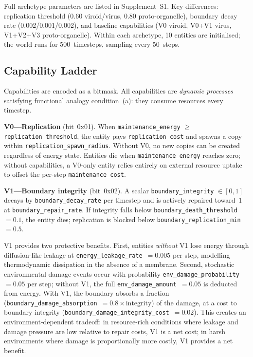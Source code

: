 \documentclass[letterpaper]{article}
\begin{document}
Full archetype parameters are listed in Supplement~S1.
Key differences: replication threshold (0.60 viroid/virus, 0.80 proto-organelle),
boundary decay rate (0.002/0.001/0.002), and baseline capabilities
(V0 viroid, V0+V1 virus, V1+V2+V3 proto-organelle).
Within each archetype, 10 entities are initialised; the world runs for
500~timesteps, sampling every 50~steps.

\subsection{Capability Ladder}

Capabilities are encoded as a bitmask.
All capabilities are \emph{dynamic processes} satisfying functional analogy
condition~(a): they consume resources every timestep.

\textbf{V0---Replication} (bit~0x01).
When \texttt{maintenance\_energy} $\geq$ \texttt{replication\_threshold},
the entity pays \texttt{replication\_cost} and spawns a copy within
\texttt{replication\_spawn\_radius}.
Without V0, no new copies can be created regardless of energy state.
Entities die when \texttt{maintenance\_energy} reaches zero; without
capabilities, a V0-only entity relies entirely on external resource uptake
to offset the per-step \texttt{maintenance\_cost}.

\textbf{V1---Boundary integrity} (bit~0x02).
A scalar \texttt{boundary\_integrity} $\in [0,1]$ decays by
\texttt{boundary\_decay\_rate} per timestep and is actively repaired toward~$1$
at \texttt{boundary\_repair\_rate}.
If integrity falls below \texttt{boundary\_death\_threshold}~$=0.1$, the entity
dies; replication is blocked below \texttt{boundary\_replication\_min}~$=0.5$.

V1 provides two protective benefits.
First, entities \emph{without} V1 lose energy through diffusion-like leakage
at \texttt{energy\_leakage\_rate}~$=0.005$ per step, modelling thermodynamic
dissipation in the absence of a membrane.
Second, stochastic environmental damage events occur with probability
\texttt{env\_damage\_probability}~$=0.05$ per step; without V1, the full
\texttt{env\_damage\_amount}~$=0.05$ is deducted from energy.
With V1, the boundary absorbs a fraction
(\texttt{boundary\_damage\_absorption}~$=0.8 \times \text{integrity}$) of the
damage, at a cost to boundary integrity
(\texttt{boundary\_damage\_integrity\_cost}~$=0.02$).
This creates an environment-dependent tradeoff: in resource-rich conditions
where leakage and damage pressure are low relative to repair costs, V1 is a
net cost; in harsh environments where damage is proportionally more costly,
V1 provides a net benefit.
\end{document}
